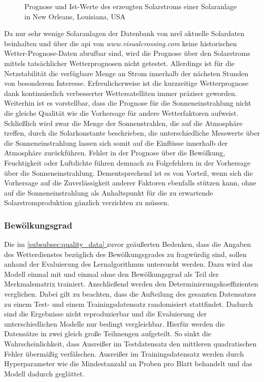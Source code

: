 \documentclass[12pt, a4paper]{article}
\newcommand*{\fullref}[1]{\hyperref[{#1}]{\autoref*{#1} \textit{\nameref*{#1}}}}
\begin{document}
\begin{figure}
\centering
\def\svgwidth{400pt}

\caption{Prognose und Ist-Werte des erzeugten Solarstroms einer Solaranlage in New Orleans, Louisiana, USA}
\label{fig:predictions_1244}
\end {figure}

Da nur sehr wenige Solaranlagen der Datenbank von \ac{nrel} aktuelle Solardaten beinhalten und über die \ac{api} von \textit{www.visualcrossing.com} keine historischen Wetter-Prognose-Daten abrufbar sind, wird die Prognose über den Solarstroms mittels tatsächlicher Wetterprognosen nicht getestet. Allerdings ist für die Netzstabilität die verfügbare Menge an Strom innerhalb der nächsten Stunden von besonderem Interesse. Erfreulicherweise ist die kurzzeitige Wetterprognose dank kontinuierlich verbesserter Wettersatelliten immer präziser geworden. Weiterhin ist es vorstellbar, dass die Prognose für die Sonneneinstrahlung nicht die gleiche Qualität wie die Vorhersage für andere Wetterfaktoren aufweist. Schließlich wird zwar die Menge der Sonnenstrahlen, die auf die Atmosphäre treffen, durch die Solarkonstante beschrieben, die unterschiedliche Messwerte über die Sonneneinstrahlung lassen sich somit auf die Einflüsse innerhalb der Atmosphäre zurückführen. Fehler in der Prognose über die Bewölkung, Feuchtigkeit oder Luftdichte führen demnach zu Folgefehlern in der Vorhersage über die Sonneneinstrahlung. Dementsprechend ist es von Vorteil, wenn sich die Vorhersage auf die Zuverlässigkeit anderer Faktoren ebenfalls stützen kann, ohne auf die Sonneneinstrahlung als Anhaltspunkt für die zu erwartende Solarstromproduktion gänzlich verzichten zu müssen.

\subsubsection{Bewölkungsgrad}

Die im \fullref{subsubsec:quality_data} zuvor geäußerten Bedenken, dass die Angaben des Wetterdienstes bezüglich des Bewölkungsgrades zu fragwürdig sind, sollen anhand der Evaluierung des Lernalgorithmus untersucht werden. Dazu wird das Modell einmal mit und einmal ohne den Bewölkungsgrad als Teil der Merkmalsmatrix trainiert. Anschließend werden den Determinierungskoeffizienten verglichen. Dabei gilt zu beachten, dass die Aufteilung des gesamten Datensatzes zu einem Test- und einem Trainingsdatensatz randomisiert stattfindet. Dadurch sind die Ergebnisse nicht reproduzierbar und die Evaluierung der unterschiedlichen Modelle nur bedingt vergleichbar. Hierfür werden die Datensätze in zwei gleich große Teilmengen aufgeteilt. So sinkt die Wahrscheinlichkeit, dass Ausreißer im Testdatensatz den mittleren quadratischen Fehler übermäßig verfälschen. Ausreißer im Trainingsdatensatz werden durch Hyperparameter wie die Mindestanzahl an Proben pro Blatt behandelt und das Modell dadurch geglättet. 
\end{document}
